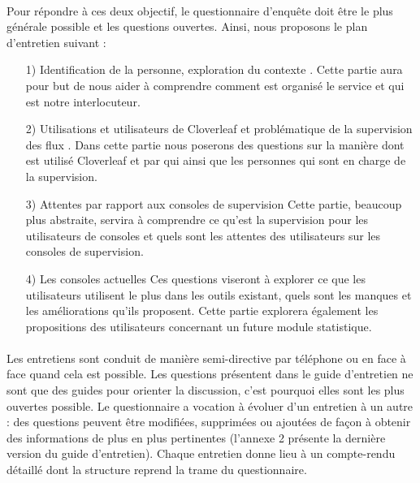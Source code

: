 			\paragraph{}%
			Pour répondre à ces deux objectif, le questionnaire d’enquête doit être le
			plus générale possible et les questions ouvertes. Ainsi, nous proposons le
			plan d'entretien suivant :
			\begin{itemize}
			  \item[1) Identification de la personne, exploration du contexte] . Cette
			  partie aura pour but de nous aider à comprendre comment est organisé le
			  service et qui est notre interlocuteur.
			  \item[2) Utilisations et utilisateurs de Cloverleaf et problématique de la
			  supervision des flux] . Dans cette partie nous poserons des questions sur
			  la manière dont est utilisé Cloverleaf et par qui ainsi que les personnes
			  qui sont en charge de la supervision.
			  \item[3) Attentes par rapport aux consoles de supervision] Cette partie,
			  beaucoup plus abstraite, servira à comprendre ce qu’est la supervision
			  pour les utilisateurs de consoles et quels sont les attentes des
			  utilisateurs sur les consoles de supervision.
			  \item[4) Les consoles actuelles] Ces questions viseront à explorer ce que
			  les utilisateurs utilisent le plus dans les outils existant, quels sont
			  les manques et les améliorations qu’ils proposent. Cette partie explorera
			  également les propositions des utilisateurs concernant un future module
			  statistique.
			\end{itemize}
			
			\paragraph{}%
			Les entretiens sont conduit de manière semi-directive par téléphone ou en
			face à face quand cela est possible.
			Les questions présentent dans le guide d'entretien ne sont que des guides
			pour orienter la discussion, c’est pourquoi elles sont les plus ouvertes possible.\newline
			Le questionnaire a vocation à évoluer d’un entretien à un autre : des
			questions peuvent être modifiées, supprimées ou ajoutées de façon à obtenir
			des informations de plus en plus pertinentes (l'annexe 2 présente la dernière
			version du guide d'entretien). Chaque entretien donne lieu à un compte-rendu
			détaillé dont la structure reprend la trame du questionnaire.
			
